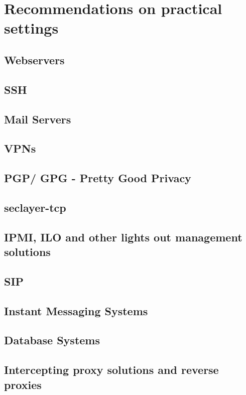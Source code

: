 \newpage
\section{Recommendations on practical settings}
\label{section:PracticalSettings}


\subsection{Webservers}


\subsection{SSH}


\subsection{Mail Servers}



\subsection{VPNs}



\subsection{PGP/ GPG - Pretty Good Privacy}



\subsection{seclayer-tcp}



\subsection{IPMI, ILO and other lights out management solutions}



\subsection{SIP}


\subsection{Instant Messaging Systems}



\subsection{Database Systems}



\subsection{Intercepting proxy solutions and reverse proxies}
 



